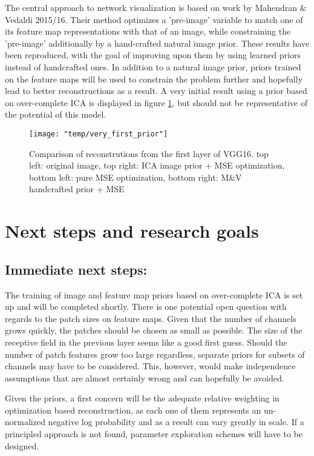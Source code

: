 \documentclass{article}
\begin{document}
The central approach to network visualization is based on work by Mahendran \& Vedaldi 2015/16. Their method optimizes a 'pre-image' variable to match one of its feature map representations with that of an image, while constraining the 'pre-image' additionally by a hand-crafted natural image prior. These results have been reproduced, with the goal of improving upon them by using learned priors instead of handcrafted ones. In addition to a natural image prior, priors trained on the feature maps will be used to constrain the problem further and hopefully lead to better reconstructions as a result. A very initial result using a prior based on over-complete ICA is displayed in figure \ref{fig:first_ica}, but should not be representative of the potential of this model.

\begin{figure}
	\centering
	\texttt{[image: "temp/very\_first\_prior"]}
	\caption{Comparison of reconstrutions from the first layer of VGG16.
		top left: original image, top right: ICA image prior + MSE optimization, bottom left: pure MSE optimization, bottom right: M\&V handcrafted prior + MSE}
	\label{fig:first_ica}
\end{figure}


\FloatBarrier
\section{Next steps and research goals}

\subsection{Immediate next steps:}

The training of image and feature map priors based on over-complete ICA is set up and will be completed shortly. There is one potential open question with regards to the patch sizes on feature maps. Given that the number of channels grows quickly, the patches should be chosen as small as possible. The size of the receptive field in the previous layer seems like a good first guess. Should the number of patch features grow too large regardless, separate priors for subsets of channels may have to be considered. This, however, would make independence assumptions that are almost certainly wrong and can hopefully be avoided. 

Given the priors, a first concern will be the adequate relative weighting in optimization based reconstruction, as each one of them represents an un-normalized negative log probability and as a result can vary greatly in scale. If a principled approach is not found, parameter exploration schemes will have to be designed.
\end{document}
